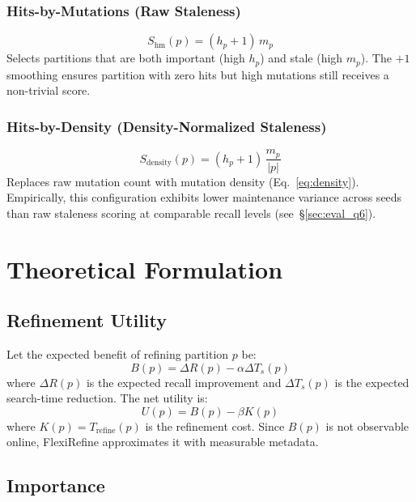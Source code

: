 \documentclass[sigconf, nonacm]{acmart}
\newcommand{\system}{FlexiRefine\xspace}
\begin{document}
\subsubsection{Hits-by-Mutations (Raw Staleness)}
\begin{equation}
  S_{\mathrm{hm}}(p) = (h_p + 1)\, m_p
  \label{eq:raw_score}
\end{equation}
Selects partitions that are both important (high $h_p$) and stale
(high $m_p$). The $+1$ smoothing ensures partition with zero hits
but high mutations still receives a non-trivial score.

\subsubsection{Hits-by-Density (Density-Normalized Staleness)}
\begin{equation}
  S_{\mathrm{density}}(p) = (h_p + 1)\, \frac{m_p}{|p|}
  \label{eq:density_score}
\end{equation}
Replaces raw mutation count with mutation density
(Eq.~\ref{eq:density}). Empirically, this configuration exhibits
lower maintenance variance across seeds than raw staleness scoring at
comparable recall levels (see~\S\ref{sec:eval_q6}).

\section{Theoretical Formulation}
\label{sec:theory}

\subsection{Refinement Utility}

Let the expected benefit of refining partition $p$ be:
\begin{equation}
  B(p) = \Delta R(p) - \alpha \Delta T_s(p)
\end{equation}
where $\Delta R(p)$ is the expected recall improvement and
$\Delta T_s(p)$ is the expected search-time reduction.
The net utility is:
\begin{equation}
  U(p) = B(p) - \beta K(p)
\end{equation}
where $K(p) = T_{\mathrm{refine}}(p)$ is the refinement cost.
Since $B(p)$ is not observable online, \system approximates it with
measurable metadata.

\subsection{Importance}
\end{document}
